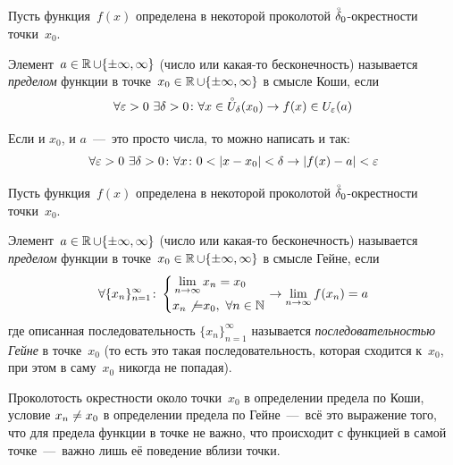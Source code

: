 \documentclass[a4paper,12pt]{article}
\renewcommand{\mathring}[1]{\accentset{\circ}{#1}}
\begin{document}
  \begin{definition}
    Пусть функция~$f(x)$ определена в некоторой проколотой $\mathring \delta_0$-окрестности точки~$x_0$.

    Элемент~$a \hm\in \RR \hm\cup \{\pm \infty, \infty\}$ (число или какая-то бесконечность) называется \emph{пределом} функции в точке~$x_0 \hm\in \RR \hm\cup \{\pm \infty, \infty\}$ в смысле Коши, если
    \begin{equation}\label{eq:koshi}
      \forall \eps > 0\ \exists \delta > 0\colon \forall x \in \mathring U_{\delta}(x_0) \to f(x) \in U_{\eps}(a)
    \end{equation}

    Если и $x_0$, и $a$~---~это просто числа, то можно написать и так:
    \[
      \forall \varepsilon > 0\ \exists \delta > 0\colon \forall x\colon 0 < |x - x_0| < \delta \to |f(x) - a| < \varepsilon
    \]
  \end{definition}

  \begin{definition}
    Пусть функция~$f(x)$ определена в некоторой проколотой $\mathring \delta_0$-окрестности точки~$x_0$.

    Элемент~$a \hm\in \RR \hm\cup \{\pm \infty, \infty\}$ (число или какая-то бесконечность) называется \emph{пределом} функции в точке~$x_0 \hm\in \RR \hm\cup \{\pm \infty, \infty\}$ в смысле Гейне, если  %
    \begin{equation}\label{eq:giyne}
      \forall \{x_n\}_{n=1}^{\infty}\colon \left\{
        \begin{aligned}
          &\lim_{n \to \infty} x_n = x_0\\
          &x_n \not{=} x_0,\ \forall n \in \mathbb N
        \end{aligned}
      \right.
      \to \lim_{n \to \infty} f(x_n) = a
    \end{equation}
    где описанная последовательность $\{x_n\}_{n=1}^{\infty}$ называется \emph{последовательностью Гейне} в точке~$x_0$ (то есть это такая последовательность, которая сходится к~$x_0$, при этом в саму~$x_0$ никогда не попадая).
  \end{definition}

  \begin{remark}
    Проколотость окрестности около точки~$x_0$ в определении предела по Коши, условие $x_n \hm{\not=} x_0$ в определении предела по Гейне~---~всё это выражение того, что для предела функции в точке не важно, что происходит с функцией в самой точке~---~важно лишь её поведение вблизи точки.
  \end{remark}
\end{document}
